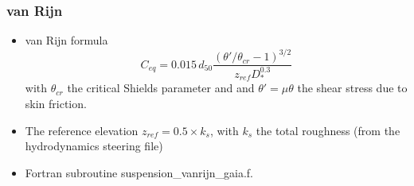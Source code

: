 \subsubsection{van Rijn}
\begin{itemize}
\item van Rijn formula~\cite{vanRijn84b} 
\begin{equation*}
C_{eq} =0.015\,d_{50}\frac{\left(\theta'/\theta_{cr}-1\right)^{3/2}}{z_{ref}D_*^{0.3}}
\end{equation*}
with $\theta_{cr}$ the critical Shields parameter and and $\theta'= \mu\theta$ the shear stress due to skin friction.
\item The reference elevation $z_{ref}=0.5 \times k_s$, with $k_s$ the total roughness (from the hydrodynamics steering file)
\item Fortran subroutine {\ttfamily suspension\_vanrijn\_gaia.f}.
\end{itemize}

